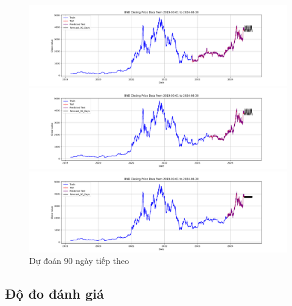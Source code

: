 \documentclass[conference]{IEEEtran}
\begin{document}
	\begin{figure}[H]
		\centering
		\begin{minipage}{0.15\textwidth}
			\centering
			\includegraphics[width=1\textwidth]{Figure/RandomForest_ETH_90days_73.png}
		\end{minipage}
		\hfill
		\begin{minipage}{0.15\textwidth}
			\centering
			\includegraphics[width=1\textwidth]{Figure/RandomForest_ETH_90days_82.png}
		\end{minipage}
		\hfill
		\begin{minipage}{0.15\textwidth}
			\centering
			\includegraphics[width=1\textwidth]{Figure/RandomForest_ETH_90days_91.png}
		\end{minipage}
		\caption{Dự đoán 90 ngày tiếp theo}
		\label{fig:1}
	\end{figure}
	
	\subsection{Độ đo đánh giá}
\end{document}
